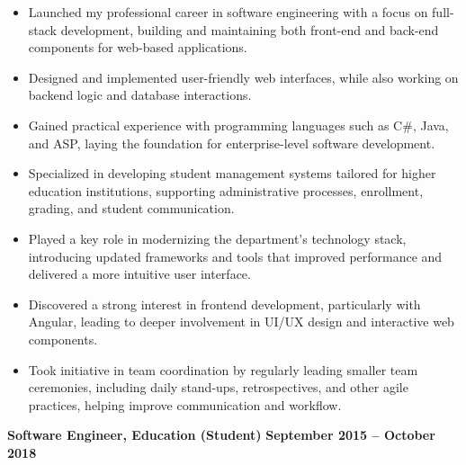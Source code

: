 \documentclass[10pt, a4paper]{cvhari}
\begin{document}
    \vspace{0.2em}
    \begin{itemize}
         
        \item Launched my professional career in software engineering with a focus on full-stack development, building and maintaining both front-end and back-end components for web-based applications.

        \item Designed and implemented user-friendly web interfaces, while also working on backend logic and database interactions.

        \item Gained practical experience with programming languages such as C\#, Java, and ASP, laying the foundation for enterprise-level software development.

        \item Specialized in developing student management systems tailored for higher education institutions, supporting administrative processes, enrollment, grading, and student communication.

        \item Played a key role in modernizing the department’s technology stack, introducing updated frameworks and tools that improved performance and delivered a more intuitive user interface.

        \item Discovered a strong interest in frontend development, particularly with Angular, leading to deeper involvement in UI/UX design and interactive web components.

        \item Took initiative in team coordination by regularly leading smaller team ceremonies, including daily stand-ups, retrospectives, and other agile practices, helping improve communication and workflow.

\end{itemize}

\smallskip
\divider
\smallskip

    \textbf{Software Engineer, Education (Student)} \hfill \textbf{September 2015 -- October 2018}
\end{document}
